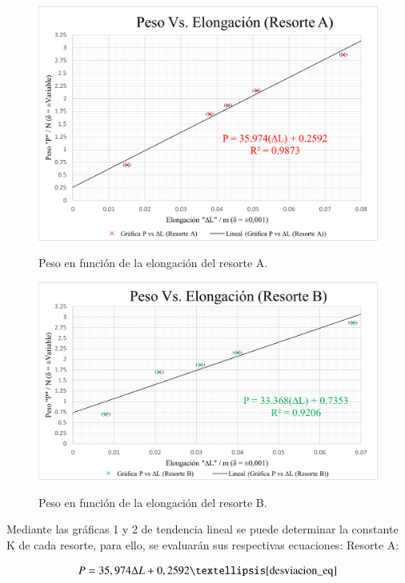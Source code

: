 \documentclass[../main.tex]{subfiles}
\begin{document}
\begin{figure}[H]
    \centering
    \includegraphics[width=0.8\linewidth]{images/calc1.png}
    \label{ref:calc1}
    \caption{Peso en función de la elongación del resorte A.}
\end{figure}
\begin{figure}[H]
    \centering
    \includegraphics[width=0.8\linewidth]{images/calc2.png}
    \label{ref:calc2}
    \caption{Peso en función de la elongación del resorte B.}
\end{figure}

Mediante las gráficas 1 y 2 de tendencia lineal se puede determinar la
constante K de cada resorte, para ello, se evaluarán sus respectivas ecuaciones:
Resorte A:

\[P=35,974 \Delta  L +0,2592…\ref{desviacion_eq}\]
\end{document}
